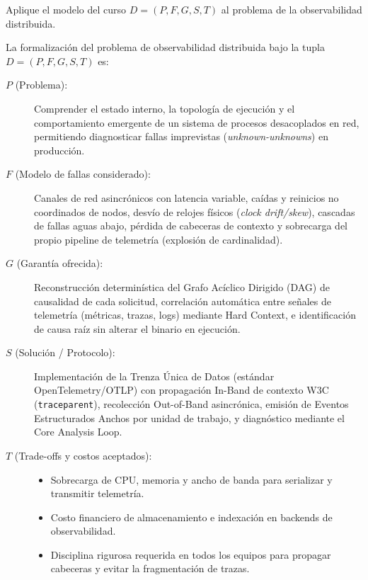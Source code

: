 \documentclass[variant=guia,cover=institutional,mode=screen]{ua-engineering-v6-article}
\begin{document}
\begin{uaexercise}
Aplique el modelo del curso $D=(P,F,G,S,T)$ al problema de la observabilidad distribuida.
\end{uaexercise}
\begin{uaanswer}
La formalización del problema de observabilidad distribuida bajo la tupla $D=(P, F, G, S, T)$ es:
\begin{description}
\item[$P$ (Problema):] Comprender el estado interno, la topología de ejecución y el comportamiento emergente de un sistema de procesos desacoplados en red, permitiendo diagnosticar fallas imprevistas (\emph{unknown-unknowns}) en producción.
\item[$F$ (Modelo de fallas considerado):] Canales de red asincrónicos con latencia variable, caídas y reinicios no coordinados de nodos, desvío de relojes físicos (\emph{clock drift/skew}), cascadas de fallas aguas abajo, pérdida de cabeceras de contexto y sobrecarga del propio pipeline de telemetría (explosión de cardinalidad).
\item[$G$ (Garantía ofrecida):] Reconstrucción determinística del Grafo Acíclico Dirigido (DAG) de causalidad de cada solicitud, correlación automática entre señales de telemetría (métricas, trazas, logs) mediante Hard Context, e identificación de causa raíz sin alterar el binario en ejecución.
\item[$S$ (Solución / Protocolo):] Implementación de la Trenza Única de Datos (estándar OpenTelemetry/OTLP) con propagación In-Band de contexto W3C (\texttt{traceparent}), recolección Out-of-Band asincrónica, emisión de Eventos Estructurados Anchos por unidad de trabajo, y diagnóstico mediante el Core Analysis Loop.
\item[$T$ (Trade-offs y costos aceptados):]
\begin{itemize}
\item Sobrecarga de CPU, memoria y ancho de banda para serializar y transmitir telemetría.
\item Costo financiero de almacenamiento e indexación en backends de observabilidad.
\item Disciplina rigurosa requerida en todos los equipos para propagar cabeceras y evitar la fragmentación de trazas.
\end{itemize}
\end{description}
\end{uaanswer}
\end{document}
